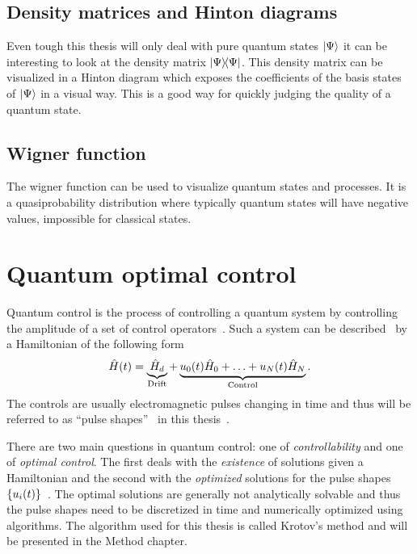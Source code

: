 \documentclass[main.tex]{subfiles}
\begin{document}
\subsection{Density matrices and Hinton diagrams}
Even tough this thesis will only deal with pure quantum states \(\ket{\Psi}\) it can be interesting to look at the density matrix \(\op{\Psi}\).
This density matrix can be visualized in a Hinton diagram which exposes the coefficients of the basis states of \(\ket{\Psi}\) in a visual way.
This is a good way for quickly judging the quality of a quantum state.

\subsection{Wigner function}
The wigner function can be used to visualize quantum states and processes.
It is a quasiprobability distribution where typically quantum states will have negative values, impossible for classical states.


\section{Quantum optimal control}
Quantum control is the process of controlling a quantum system by controlling the amplitude of a set of control operators~\cite{fisher_optimal_2010}.
Such a system can be described~\cite{fisher_optimal_2010} by a Hamiltonian of the following form
\begin{equation}
    \hat{H}(t) = \underbrace{\hat{H}_d}_{\text{Drift}} + \underbrace{u_0(t)\hat{H}_0 + \dotsc + u_N(t)\hat{H}_N}_{\text{Control}}.
    \label{eq:optimal-control-hamiltonian}
\end{equation}
The controls are usually electromagnetic pulses changing in time and thus will be referred to as ``pulse shapes''~\cite{fisher_optimal_2010} in this thesis~.

There are two main questions in quantum control: one of \emph{controllability} and one of \emph{optimal control}.
The first deals with the \emph{existence} of solutions given a Hamiltonian and the second with the \emph{optimized} solutions for the pulse shapes \(\qty{u_i(t)}\)~\cite{dalessandro_introduction_2007}.
The optimal solutions are generally not analytically solvable and thus the pulse shapes need to be discretized in time and numerically optimized using algorithms.
The algorithm used for this thesis is called Krotov's method and will be presented in the Method chapter.
\end{document}
